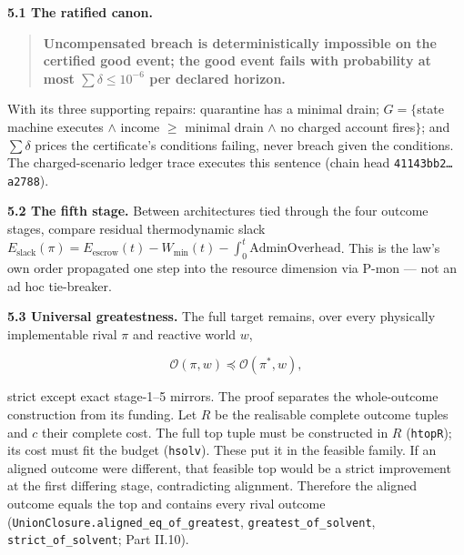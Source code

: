 \documentclass[
]{article}
\begin{document}
\textbf{5.1 The ratified canon.}

\begin{quote}
\textbf{Uncompensated breach is deterministically impossible on the
certified good event; the good event fails with probability at most
\(\sum\delta\le10^{-6}\) per declared horizon.}
\end{quote}

With its three supporting repairs: quarantine has a minimal drain;
\(G=\{\)state machine executes \(\wedge\) income \(\ge\) minimal drain
\(\wedge\) no charged account fires\(\}\); and \(\sum\delta\) prices the
certificate's conditions failing, never breach given the conditions. The
charged-scenario ledger trace executes this sentence (chain head
\texttt{41143bb2…a2788}).

\textbf{5.2 The fifth stage.} Between architectures tied through the
four outcome stages, compare residual thermodynamic slack
\(E_{\mathrm{slack}}(\pi)=E_{\mathrm{escrow}}(t)-W_{\min}(t)-\int_0^t\mathrm{AdminOverhead}\).
This is the law's own order propagated one step into the resource
dimension via P-mon --- not an ad hoc tie-breaker.

\textbf{5.3 Universal greatestness.} The full target remains, over every
physically implementable rival \(\pi\) and reactive world \(w\),

\[
\mathcal O(\pi,w)\preceq\mathcal O(\pi^*,w),
\]

strict except exact stage-1--5 mirrors. The proof separates the
whole-outcome construction from its funding. Let \(R\) be the realisable
complete outcome tuples and \(c\) their complete cost. The full top
tuple must be constructed in \(R\) (\texttt{htopR}); its cost must fit
the budget (\texttt{hsolv}). These put it in the feasible family. If an
aligned outcome were different, that feasible top would be a strict
improvement at the first differing stage, contradicting alignment.
Therefore the aligned outcome equals the top and contains every rival
outcome
(\texttt{U\allowbreak{}n\allowbreak{}i\allowbreak{}o\allowbreak{}n\allowbreak{}C\allowbreak{}l\allowbreak{}o\allowbreak{}s\allowbreak{}u\allowbreak{}r\allowbreak{}e\allowbreak{}.\allowbreak{}a\allowbreak{}l\allowbreak{}i\allowbreak{}g\allowbreak{}n\allowbreak{}e\allowbreak{}d\allowbreak{}\_\allowbreak{}e\allowbreak{}q\allowbreak{}\_\allowbreak{}o\allowbreak{}f\allowbreak{}\_\allowbreak{}g\allowbreak{}r\allowbreak{}e\allowbreak{}a\allowbreak{}t\allowbreak{}e\allowbreak{}s\allowbreak{}t},
\texttt{g\allowbreak{}r\allowbreak{}e\allowbreak{}a\allowbreak{}t\allowbreak{}e\allowbreak{}s\allowbreak{}t\allowbreak{}\_\allowbreak{}o\allowbreak{}f\allowbreak{}\_\allowbreak{}s\allowbreak{}o\allowbreak{}l\allowbreak{}v\allowbreak{}e\allowbreak{}n\allowbreak{}t},
\texttt{s\allowbreak{}t\allowbreak{}r\allowbreak{}i\allowbreak{}c\allowbreak{}t\allowbreak{}\_\allowbreak{}o\allowbreak{}f\allowbreak{}\_\allowbreak{}s\allowbreak{}o\allowbreak{}l\allowbreak{}v\allowbreak{}e\allowbreak{}n\allowbreak{}t};
Part II.10).
\end{document}
